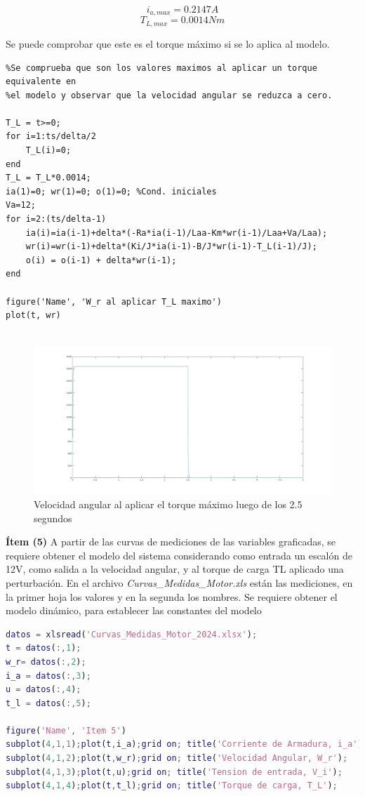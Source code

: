 \documentclass{article}
\begin{document}
$$i_{a,max}=0.2147 A$$
$$T_{L,max}=0.0014 Nm$$

Se puede comprobar que este es el torque máximo si se lo aplica al modelo.

\begin{lstlisting}
%Se comprueba que son los valores maximos al aplicar un torque equivalente en
%el modelo y observar que la velocidad angular se reduzca a cero.

T_L = t>=0;
for i=1:ts/delta/2
    T_L(i)=0;
end
T_L = T_L*0.0014;
ia(1)=0; wr(1)=0; o(1)=0; %Cond. iniciales
Va=12;
for i=2:(ts/delta-1)
    ia(i)=ia(i-1)+delta*(-Ra*ia(i-1)/Laa-Km*wr(i-1)/Laa+Va/Laa);
    wr(i)=wr(i-1)+delta*(Ki/J*ia(i-1)-B/J*wr(i-1)-T_L(i-1)/J);
    o(i) = o(i-1) + delta*wr(i-1);
end

figure('Name', 'W_r al aplicar T_L maximo')
plot(t, wr)
  
\end{lstlisting}

\begin{figure}[!h]
  \centering
  \includegraphics[width=1\textwidth]{img/mot4-2.jpg}
  \caption{Velocidad angular al aplicar el torque máximo luego de los 2.5 segundos}
\end{figure}

\textbf{Ítem (5)} A partir de las curvas de mediciones de las variables graficadas, se requiere
obtener el modelo del sistema considerando como entrada un escalón de 12V, como salida a la
velocidad angular, y al torque de carga TL aplicado una perturbación. En el archivo
\textit{Curvas\_Medidas\_Motor.xls} están las mediciones, en la primer hoja los valores y en la segunda
los nombres. Se requiere obtener el modelo dinámico, para establecer las constantes del modelo

\begin{lstlisting}[language=matlab]
% Cargamos los datos medidos
datos = xlsread('Curvas_Medidas_Motor_2024.xlsx');
t = datos(:,1);
w_r= datos(:,2);
i_a = datos(:,3);
u = datos(:,4);
t_l = datos(:,5);

figure('Name', 'Item 5')
subplot(4,1,1);plot(t,i_a);grid on; title('Corriente de Armadura, i_a');
subplot(4,1,2);plot(t,w_r);grid on; title('Velocidad Angular, W_r');
subplot(4,1,3);plot(t,u);grid on; title('Tension de entrada, V_i');
subplot(4,1,4);plot(t,t_l);grid on; title('Torque de carga, T_L');
\end{lstlisting}
\end{document}
